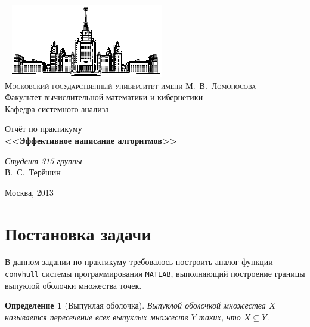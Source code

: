 \documentclass[11pt]{article}
\newtheorem{ConvexHull}{Определение}
\begin{document}
\thispagestyle{empty}

\begin{center}
\ \vspace{0cm} %
\includegraphics[width=0.5\textwidth]{msu.eps}\\
{\scshape Московский государственный университет имени М.~В.~Ломоносова}\\
Факультет вычислительной математики и кибернетики\\
Кафедра системного анализа

\vfill
{\LARGE Отчёт по практикуму} \\
\vspace{1cm}
{\Huge\bfseries <<Эффективное написание алгоритмов>>}
\end{center}

\vspace{1cm}
\begin{flushright}
\large
\textit{Студент 315 группы}\\
В.~С.~Терёшин\\
\end{flushright}

\vfill
\begin{center}
Москва, 2013
\end{center}

\pagebreak

\section{Постановка задачи}
В данном задании по практикуму требовалось построить аналог функции \texttt{convhull} системы программирования \texttt{MATLAB},
выполняющий построение границы выпуклой оболочки множества точек.
\begin{ConvexHull}[Выпуклая оболочка]
Выпуклой оболочкой множества $X$ называется пересечение всех выпуклых множеств $Y$ таких, что $X \subseteq Y$.
\end{ConvexHull}
\end{document}
